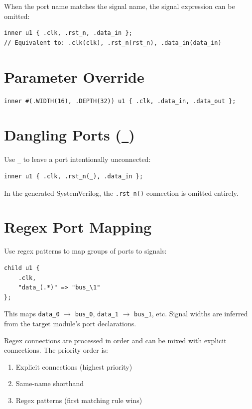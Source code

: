 \documentclass[lang=en,11pt]{elegantbook}
\newcommand{\code}[1]{\texttt{#1}}
\begin{document}
When the port name matches the signal name, the signal expression can be omitted:

\begin{lstlisting}[language=Slip]
inner u1 { .clk, .rst_n, .data_in };
// Equivalent to: .clk(clk), .rst_n(rst_n), .data_in(data_in)
\end{lstlisting}

\section{Parameter Override}

\begin{lstlisting}[language=Slip]
inner #(.WIDTH(16), .DEPTH(32)) u1 { .clk, .data_in, .data_out };
\end{lstlisting}

\section{Dangling Ports (\code{\_})}

Use \code{\_} to leave a port intentionally unconnected:

\begin{lstlisting}[language=Slip]
inner u1 { .clk, .rst_n(_), .data_in };
\end{lstlisting}

In the generated SystemVerilog, the \code{.rst\_n()} connection is omitted entirely.

\section{Regex Port Mapping}

Use regex patterns to map groups of ports to signals:

\begin{lstlisting}[language=Slip]
child u1 {
    .clk,
    "data_(.*)" => "bus_\1"
};
\end{lstlisting}

This maps \code{data\_0} $\to$ \code{bus\_0}, \code{data\_1} $\to$ \code{bus\_1}, etc. Signal widths are inferred from the target module's port declarations.

Regex connections are processed in order and can be mixed with explicit connections. The priority order is:
\begin{enumerate}
  \item Explicit connections (highest priority)
  \item Same-name shorthand
  \item Regex patterns (first matching rule wins)
\end{enumerate}
\end{document}
